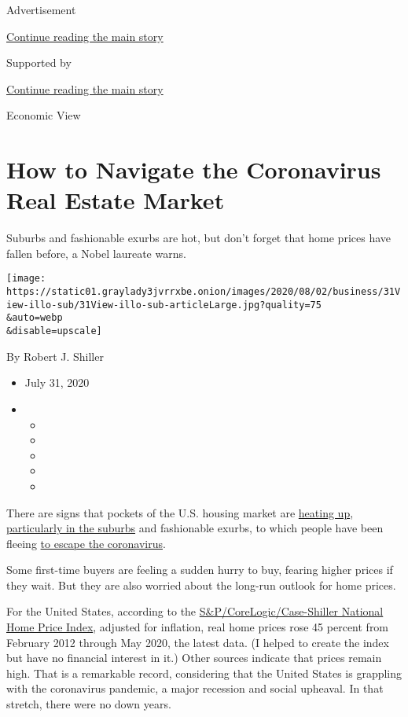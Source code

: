Advertisement

\protect\hyperlink{after-top}{Continue reading the main story}

Supported by

\protect\hyperlink{after-sponsor}{Continue reading the main story}

Economic View

\hypertarget{how-to-navigate-the-coronavirus-real-estate-market}{%
\section{How to Navigate the Coronavirus Real Estate
Market}\label{how-to-navigate-the-coronavirus-real-estate-market}}

Suburbs and fashionable exurbs are hot, but don't forget that home
prices have fallen before, a Nobel laureate warns.

\texttt{[image: https://static01.graylady3jvrrxbe.onion/images/2020/08/02/business/31View-illo-sub/31View-illo-sub-articleLarge.jpg?quality=75\\\&auto=webp\\\&disable=upscale]}

By Robert J. Shiller

\begin{itemize}
\item
  July 31, 2020
\item
  \begin{itemize}
  \item
  \item
  \item
  \item
  \item
  \end{itemize}
\end{itemize}

There are signs that pockets of the U.S. housing market are
\href{https://www.nar.realtor/newsroom/existing-home-sales-climb-record-20-7-in-june}{heating
up},
\href{https://www.realtor.com/research/housing-market-rankings-in-suburban-communities-outpaced-urban-areas-in-may/}{particularly
in the suburbs} and fashionable exurbs, to which people have been
fleeing
\href{https://www.nytimes3xbfgragh.onion/2020/05/08/realestate/coronavirus-escape-city-to-suburbs.html}{to
escape the coronavirus}.

Some first-time buyers are feeling a sudden hurry to buy, fearing higher
prices if they wait. But they are also worried about the long-run
outlook for home prices.

For the United States, according to the
\href{https://www.spglobal.com/spdji/en/indices/indicators/sp-corelogic-case-shiller-us-national-home-price-nsa-index/\#data}{S\&P/CoreLogic/Case-Shiller
National Home Price Index}, adjusted for inflation, real home prices
rose 45 percent from February 2012 through May 2020, the latest data. (I
helped to create the index but have no financial interest in it.) Other
sources indicate that prices remain high. That is a remarkable record,
considering that the United States is grappling with the coronavirus
pandemic, a major recession and social upheaval. In that stretch, there
were no down years.

